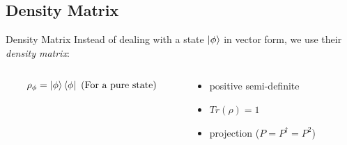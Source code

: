 \documentclass[11pt,svgnames,smaller,aspectratio=43,english]{beamer}
\begin{document}
\subsection{Density Matrix}
\begin{frame}{Density Matrix}
	Instead of dealing with a state $\ket{\phi}$ in vector form, we use their \emph{density matrix}:

	\begin{columns}
		\begin{column}[T]{0.35\textwidth}
			\begin{equation*}
				\rho_\phi = \ket{\phi}\bra{\phi} \text{ (For a pure state)}		
			\end{equation*}
		\end{column}
		\begin{column}[T]{0.5\textwidth}
			\begin{itemize}
				\item positive semi-definite
				\item $Tr(\rho) = 1$
				\item projection ($P = P^\dagger = P^2$)
			\end{itemize}
		\end{column}
	\end{columns}

	\vspace*{1em}

	
\end{frame}
\end{document}
